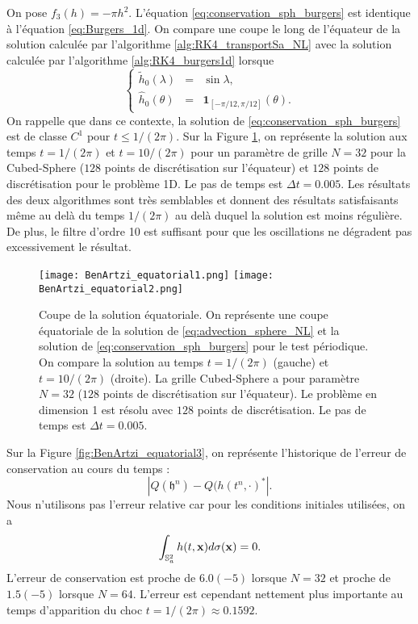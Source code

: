 On pose $f_3(h) = - \pi h^2$. L'équation \eqref{eq:conservation_sph_burgers} est identique à l'équation \eqref{eq:Burgers_1d}. On compare une coupe le long de l'équateur de la solution calculée par l'algorithme \ref{alg:RK4_transportSa_NL} avec la solution calculée par l'algorithme \ref{alg:RK4_burgers1d} lorsque
\begin{equation}
\left\lbrace
\begin{array}{rcl}
\tilde{h}_0(\lambda) & = & \sin \lambda, \\
\hat{h}_0(\theta) & = & \mathbf{1}_{[-\pi/12, \pi/12]}(\theta).
\end{array}
\right.
\end{equation}
On rappelle que dans ce contexte, la solution de \eqref{eq:conservation_sph_burgers} est de classe $C^1$ pour $t \leq 1/(2 \pi)$. Sur la Figure \ref{fig:BenArtzi_equatorial1}, on représente la solution aux temps $t=1/(2 \pi)$ et $t=10/(2\pi)$ pour un paramètre de grille $N=32$ pour la Cubed-Sphere ($128$ points de discrétisation sur l'équateur) et $128$ points de discrétisation pour le problème 1D. Le pas de temps est $\Delta t=0.005$. Les résultats des deux algorithmes sont très semblables et donnent des résultats satisfaisants même au delà du temps $1/(2 \pi)$ au delà duquel la solution est moins régulière. De plus, le filtre d'ordre 10 est suffisant pour que les oscillations ne dégradent pas excessivement le résultat.

\begin{figure}[htbp]
\begin{center}
\texttt{[image: BenArtzi\_equatorial1.png]}
\texttt{[image: BenArtzi\_equatorial2.png]}
\end{center}
\caption{Coupe de la solution équatoriale. On représente une coupe équatoriale de la solution de \eqref{eq:advection_sphere_NL} et la solution de \eqref{eq:conservation_sph_burgers} pour le test périodique. On compare la solution au temps $t=1/(2\pi)$ (gauche) et $t=10/(2\pi)$ (droite). La grille Cubed-Sphere a pour paramètre $N=32$ ($128$ points de discrétisation sur l'équateur). Le problème en dimension 1 est résolu avec $128$ points de discrétisation. Le pas de temps est $\Delta t = 0.005$.}
\label{fig:BenArtzi_equatorial1}
\end{figure} 

Sur la Figure \ref{fig:BenArtzi_equatorial3}, on représente l'historique de l'erreur de conservation au cours du temps :
\begin{equation}
|Q(\mathfrak{h}^n) - Q(h(t^n, \cdot)^*|.
\end{equation}
Nous n'utilisons pas l'erreur relative car pour les conditions initiales utilisées, on a
\begin{equation}
\displaystyle\int_{\mathbb{S}_a^2} h(t,\mathbf{x}) d \sigma(\mathbf{x}) = 0.
\end{equation}
L'erreur de conservation est proche de $6.0 (-5)$ lorsque $N=32$ et proche de $1.5 (-5)$ lorsque $N=64$. L'erreur est cependant nettement plus importante au temps d'apparition du choc $t=1/(2\pi) \approx 0.1592$. 

